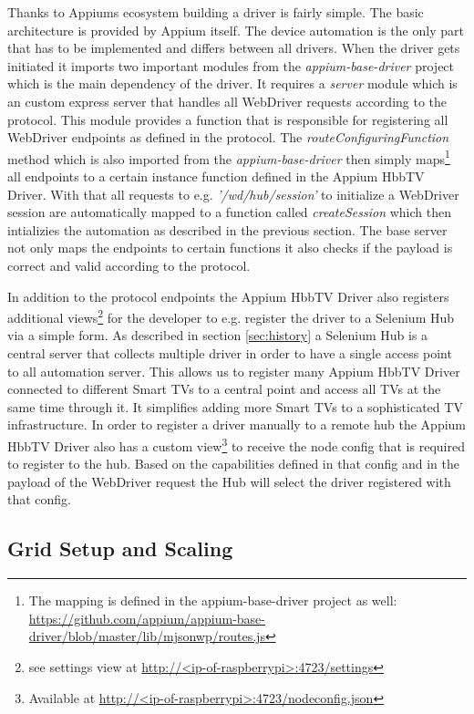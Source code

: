 Thanks to Appiums ecosystem building a driver is fairly simple. The basic architecture is provided by Appium itself.
The device automation is the only part that has to be implemented and differs between all drivers. When the driver
gets initiated it imports two important modules from the \textit{appium-base-driver} project which is the main
dependency of the driver. It requires a \textit{server} module which is an custom express server that handles
all WebDriver requests according to the protocol. This module provides a function that is responsible for registering
all WebDriver endpoints as defined in the protocol. The \textit{routeConfiguringFunction} method which is also
imported from the \textit{appium-base-driver} then simply maps\footnote{The mapping is defined in the appium-base-driver
project as well: \url{https://github.com/appium/appium-base-driver/blob/master/lib/mjsonwp/routes.js}} all endpoints
to a certain instance function defined in the Appium HbbTV Driver. With that all requests to e.g. \textit{'/wd/hub/session'}
to initialize a WebDriver session are automatically mapped to a function called \textit{createSession} which then
intializies the automation as described in the previous section. The base server not only maps the endpoints to
certain functions it also checks if the payload is correct and valid according to the protocol.

In addition to the protocol endpoints the Appium HbbTV Driver also registers additional views\footnote{see settings
view at \url{http://<ip-of-raspberrypi>:4723/settings}} for the developer to e.g. register the driver to a
Selenium Hub via a simple form. As described in section \ref{sec:history} a Selenium Hub is a central server that
collects multiple driver in order to have a single access point to all automation server. This allows us to register
many Appium HbbTV Driver connected to different Smart TVs to a central point and access all TVs at the same time
through it. It simplifies adding more Smart TVs to a sophisticated TV infrastructure. In order to register a driver
manually to a remote hub the Appium HbbTV Driver also has a custom view\footnote{Available at
\url{http://<ip-of-raspberrypi>:4723/nodeconfig.json}} to receive the node config that is required to register to the
hub. Based on the capabilities defined in that config and in the payload of the WebDriver request the Hub will select
the driver registered with that config.

\subsection{Grid Setup and Scaling\label{sec:setupscaling}}

